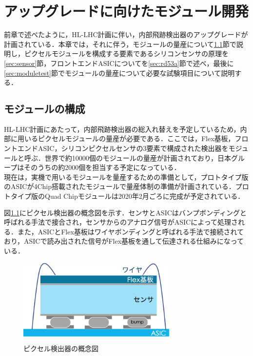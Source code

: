 \chapter{アップグレードに向けたモジュール開発}
前章で述べたように，HL-LHC計画に伴い，内部飛跡検出器のアップグレードが計画されている．本章では，それに伴う，モジュールの量産について\ref{sec:masspro}節で説明し，ピクセルモジュールを構成する要素であるシリコンセンサの原理を\ref{sec:sensor}節，フロントエンドASICについてを\ref{sec:rd53a}節で述べ，最後に\ref{sec:moduletest}節でモジュールの量産について必要な試験項目について説明する．\\

\section{モジュールの構成}
\label{sec:masspro}
HL-LHC計画にあたって，内部飛跡検出器の総入れ替えを予定しているため，内部に用いるピクセルモジュールの量産が必要である．ここでは，Flex基板，フロントエンドASIC，シリコンピクセルセンサの3要素で構成された検出器をモジュールと呼ぶ．世界で約10000個のモジュールの量産が計画されており，日本グループはそのうちの約2000個を担当する予定になっている．\\
現在は，実機で用いるモジュールを量産するための準備として，プロトタイプ版のASICが4$\mathrm{Chip}$搭載されたモジュールで量産体制の準備が計画されている．プロトタイプ版のQuad Chipモジュールは2020年2月ごろに完成が予定されている．\par
図\ref{fig:module}にピクセル検出器の概念図を示す．センサとASICはバンプボンディングと呼ばれる手法で接合され，センサからのアナログ信号がASICによって処理される．また，ASICとFlex基板はワイヤボンディングと呼ばれる手法で接続されており，ASICで読み出された信号がFlex基板を通して伝達される仕組みになっている．\par

\begin{figure}[h]
  \centering
  \includegraphics[width=8cm]{./figure/module.png}
  \caption{ピクセル検出器の概念図}
  \label{fig:module}
\end{figure}

